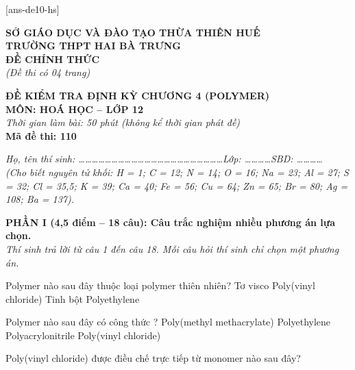 \documentclass[11pt,a4paper]{article}
\def\loigiai#1{}
\begin{document}
[ans-de10-hs]

\noindent
\begin{minipage}[t]{0.48\textwidth}
	\centering
	\textbf{SỞ GIÁO DỤC VÀ ĐÀO TẠO THỪA THIÊN HUẾ}\\
	\textbf{TRƯỜNG THPT HAI BÀ TRƯNG}\\
	\textbf{ĐỀ CHÍNH THỨC}\\
	\textit{(Đề thi có 04 trang)}
\end{minipage}\hfill
\begin{minipage}[t]{0.48\textwidth}
	\centering
	\textbf{\color{mainGreen}ĐỀ KIỂM TRA ĐỊNH KỲ CHƯƠNG 4 (POLYMER)}\\
	\textbf{MÔN: HOÁ HỌC -- LỚP 12}\\
	\textit{Thời gian làm bài: 50 phút (không kể thời gian phát đề)}\\
	\textbf{Mã đề thi: 110}
\end{minipage}


\vspace{0.1cm}
\noindent\textit{Họ, tên thí sinh: \dots\dots\dots\dots\dots\dots\dots\dots\dots\dots\dots\dots\dots\dots\dots\dots\dots\dots\dots\dots\dots\dots Lớp: \dots\dots\dots\dots SBD: \dots\dots\dots\dots}\\
\noindent\textit{(Cho biết nguyên tử khối: H = 1; C = 12; N = 14; O = 16; Na = 23; Al = 27; S = 32; Cl = 35,5; K = 39; Ca = 40; Fe = 56; Cu = 64; Zn = 65; Br = 80; Ag = 108; Ba = 137).}

\vspace{0.15cm}
\noindent
\textbf{PHẦN I (4,5 điểm -- 18 câu): Câu trắc nghiệm nhiều phương án lựa chọn.}\\
\textit{Thí sinh trả lời từ câu 1 đến câu 18. Mỗi câu hỏi thí sinh chỉ chọn một phương án.}

\setcounter{ex}{0}

\begin{ex}
Polymer nào sau đây thuộc loại polymer thiên nhiên?
\choice
{Tơ visco}
{Poly(vinyl chloride)}
{Tinh bột}
{Polyethylene}
\loigiai{}
\end{ex}

\begin{ex}
Polymer nào sau đây có công thức ?
\choice
{Poly(methyl methacrylate)}
{Polyethylene}
{Polyacrylonitrile}
{Poly(vinyl chloride)}
\loigiai{}
\end{ex}

\begin{ex}
Poly(vinyl chloride) được điều chế trực tiếp từ monomer nào sau đây?
\choice
{}
{}
{}
{}
\loigiai{}
\end{ex}
\end{document}
